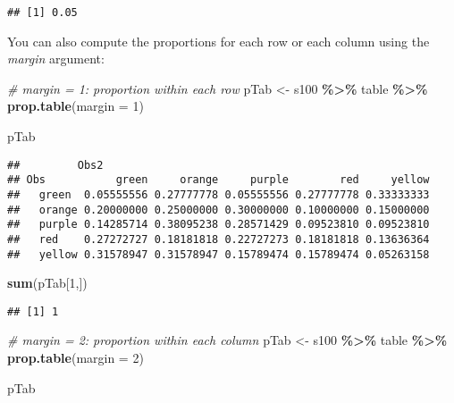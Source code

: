 \documentclass[
]{article}
\newenvironment{Shaded}{\begin{snugshade}}{\end{snugshade}}
\newcommand{\AttributeTok}[1]{\textcolor[rgb]{0.13,0.29,0.53}{#1}}
\newcommand{\CommentTok}[1]{\textcolor[rgb]{0.56,0.35,0.01}{\textit{#1}}}
\newcommand{\DecValTok}[1]{\textcolor[rgb]{0.00,0.00,0.81}{#1}}
\newcommand{\FunctionTok}[1]{\textcolor[rgb]{0.13,0.29,0.53}{\textbf{#1}}}
\newcommand{\NormalTok}[1]{#1}
\newcommand{\OtherTok}[1]{\textcolor[rgb]{0.56,0.35,0.01}{#1}}
\newcommand{\SpecialCharTok}[1]{\textcolor[rgb]{0.81,0.36,0.00}{\textbf{#1}}}
\begin{document}
\begin{verbatim}
## [1] 0.05
\end{verbatim}

You can also compute the proportions for each row or each column using
the \emph{margin} argument:

\begin{Shaded}
\begin{Highlighting}[]
\CommentTok{\# margin = 1: proportion within each row}
\NormalTok{pTab }\OtherTok{\textless{}{-}}\NormalTok{ s100 }\SpecialCharTok{\%\textgreater{}\%}
\NormalTok{  table }\SpecialCharTok{\%\textgreater{}\%}
  \FunctionTok{prop.table}\NormalTok{(}\AttributeTok{margin =} \DecValTok{1}\NormalTok{)}

\NormalTok{pTab}
\end{Highlighting}
\end{Shaded}

\begin{verbatim}
##         Obs2
## Obs           green     orange     purple        red     yellow
##   green  0.05555556 0.27777778 0.05555556 0.27777778 0.33333333
##   orange 0.20000000 0.25000000 0.30000000 0.10000000 0.15000000
##   purple 0.14285714 0.38095238 0.28571429 0.09523810 0.09523810
##   red    0.27272727 0.18181818 0.22727273 0.18181818 0.13636364
##   yellow 0.31578947 0.31578947 0.15789474 0.15789474 0.05263158
\end{verbatim}

\begin{Shaded}
\begin{Highlighting}[]
\FunctionTok{sum}\NormalTok{(pTab[}\DecValTok{1}\NormalTok{,])}
\end{Highlighting}
\end{Shaded}

\begin{verbatim}
## [1] 1
\end{verbatim}

\begin{Shaded}
\begin{Highlighting}[]
\CommentTok{\# margin = 2: proportion within each column }
\NormalTok{pTab }\OtherTok{\textless{}{-}}\NormalTok{ s100 }\SpecialCharTok{\%\textgreater{}\%}
\NormalTok{  table }\SpecialCharTok{\%\textgreater{}\%}
  \FunctionTok{prop.table}\NormalTok{(}\AttributeTok{margin =} \DecValTok{2}\NormalTok{)}

\NormalTok{pTab}
\end{Highlighting}
\end{Shaded}
\end{document}

